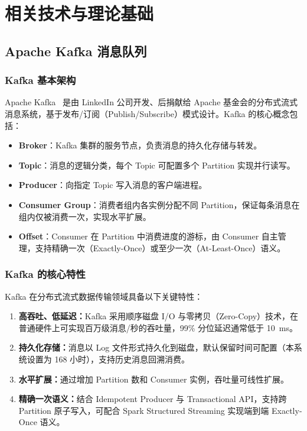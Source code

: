 
\chapter{相关技术与理论基础}

\section{Apache Kafka 消息队列}

\subsection{Kafka 基本架构}

Apache Kafka~\cite{kafka2011} 是由 LinkedIn 公司开发、后捐献给 Apache 基金会的分布式流式消息系统，基于发布/订阅（Publish/Subscribe）模式设计。Kafka 的核心概念包括：

\begin{itemize}
  \item \textbf{Broker}：Kafka 集群的服务节点，负责消息的持久化存储与转发。
  \item \textbf{Topic}：消息的逻辑分类，每个 Topic 可配置多个 Partition 实现并行读写。
  \item \textbf{Producer}：向指定 Topic 写入消息的客户端进程。
  \item \textbf{Consumer Group}：消费者组内各实例分配不同 Partition，保证每条消息在组内仅被消费一次，实现水平扩展。
  \item \textbf{Offset}：Consumer 在 Partition 中消费进度的游标，由 Consumer 自主管理，支持精确一次（Exactly-Once）或至少一次（At-Least-Once）语义。
\end{itemize}

\subsection{Kafka 的核心特性}

Kafka 在分布式流式数据传输领域具备以下关键特性：

\begin{enumerate}
  \item \textbf{高吞吐、低延迟：}Kafka 采用顺序磁盘 I/O 与零拷贝（Zero-Copy）技术，在普通硬件上可实现百万级消息/秒的吞吐量，99\% 分位延迟通常低于 10~ms。
  \item \textbf{持久化存储：}消息以 Log 文件形式持久化到磁盘，默认保留时间可配置（本系统设置为 168 小时），支持历史消息回溯消费。
  \item \textbf{水平扩展：}通过增加 Partition 数和 Consumer 实例，吞吐量可线性扩展。
  \item \textbf{精确一次语义：}结合 Idempotent Producer 与 Transactional API，支持跨 Partition 原子写入，可配合 Spark Structured Streaming 实现端到端 Exactly-Once 语义。
\end{enumerate}


